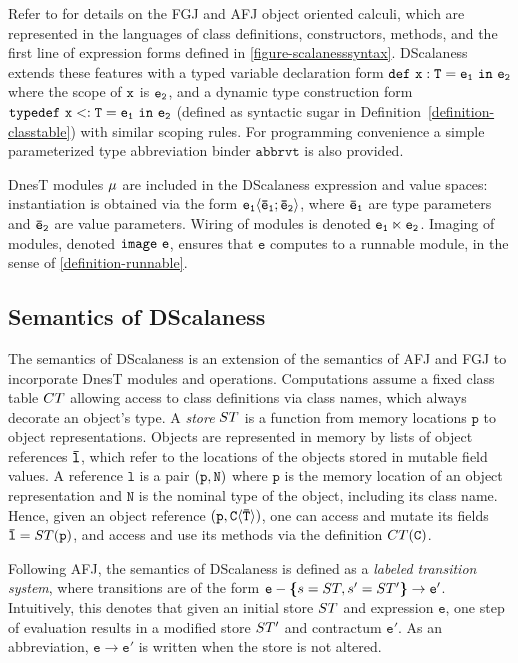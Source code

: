 Refer to \cite{FJ,AFJ} for details on the FGJ and AFJ object oriented calculi, which are
represented in the languages of class definitions, constructors, methods, and the first line of
expression forms defined in \autoref{figure-scalanesssyntax}. DScalaness extends these features
with a typed variable declaration form $\jdef{x}{T}{e_1}{e_2}$ where the scope of $\tt{x}$ is
$\tt{e_2}$, and a dynamic type construction form $\jtlet{x}{T}{e_1}{e_2}$ (defined as syntactic
sugar in Definition~\autoref{definition-classtable}) with similar scoping rules. For programming
convenience a simple parameterized type abbreviation binder $\texttt{abbrvt}$ is also provided.

DnesT modules $\jmodval$ are included in the DScalaness expression and value spaces:
instantiation is obtained via the form $\jinst{e_1}{\ttvec{e}_1; \ttvec{e}_2}$, where
$\ttvec{e}_\texttt{1}$ are type parameters and $\ttvec{e}_\texttt{2}$ are value parameters.
Wiring of modules is denoted $\jwire{\tt{e_1}}{\tt{e_2}}$. Imaging of modules, denoted
$\jimage{\texttt{e}}$, ensures that $\texttt{e}$ computes to a runnable module, in the sense of
\autoref{definition-runnable}.

\subsection{Semantics of DScalaness}
\label{section-dscalaness-semantics}

The semantics of DScalaness is an extension of the semantics of AFJ and FGJ to incorporate DnesT
modules and operations. Computations assume a fixed class table $\CT$ allowing access to class
definitions via class names, which always decorate an object's type. A \emph{store} $\jstore$ is
a function from memory locations $\texttt{p}$ to object representations. Objects are represented
in memory by lists of object references $\ttvec{l}$, which refer to the locations of the objects
stored in mutable field values. A reference $\texttt{l}$ is a pair $\jref{\texttt{p}}{N}$ where
$\texttt{p}$ is the memory location of an object representation and $\texttt{N}$ is the nominal
type of the object, including its class name. Hence, given an object reference
$\jref{\texttt{p}}{\jinst{C}{\ttvec{T}}}$, one can access and mutate its fields $\ttvec{l} =
\jstore(\texttt{p})$, and access and use its methods via the definition $\CT(\texttt{C})$.

Following AFJ, the semantics of DScalaness is defined as a \emph{labeled transition system},
where transitions are of the form $\texttt{e} - \lc s = \jstore, s' = \jstore' \rc \rightarrow
\texttt{e}' $. Intuitively, this denotes that given an initial store $\jstore$ and expression
$\texttt{e}$, one step of evaluation results in a modified store $\jstore'$ and contractum
$\texttt{e}'$. As an abbreviation, $\texttt{e} \rightarrow \texttt{e}'$ is written when the
store is not altered.

